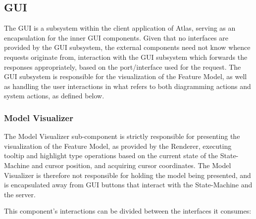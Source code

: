 
\subsection{GUI}

The GUI is a subsystem within the client application of Atlas, serving as an encapsulation for the inner GUI components. Given that no interfaces are provided by the GUI subsystem, the external components need not know whence requests originate from, interaction with the GUI subsystem which forwards the responses appropriately, based on the port/interface used for the request. The GUI subsystem is responsible for the visualization of the Feature Model, as well as handling the user interactions in what refers to both diagramming actions and system actions, as defined below.


\subsubsection{Model Visualizer}

The Model Visualizer sub-component is strictly responsible for presenting the visualization of the Feature Model, as provided by the Renderer, executing tooltip and highlight type operations based on the current state of the State-Machine and cursor position, and acquiring cursor coordinates. The Model Visualizer is therefore not responsible for holding the model being presented, and is encapsulated away from GUI buttons that interact with the State-Machine and the server.

This component's interactions can be divided between the interfaces it consumes:

